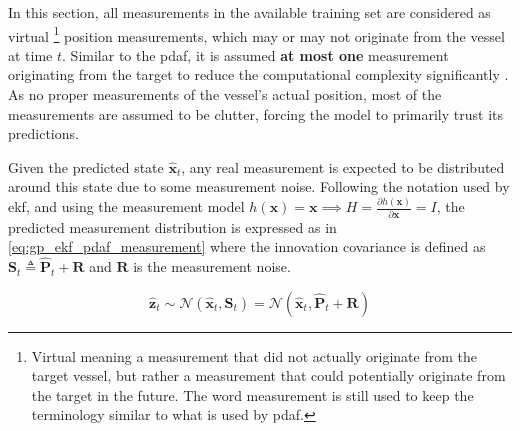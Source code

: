 In this section, all measurements in the available training set are considered as virtual \footnote{Virtual meaning a measurement that did not actually originate from the target vessel, but rather a measurement that could potentially originate from the target in the future. The word measurement is still used to keep the terminology similar to what is used by \acrshort{pdaf}.} position measurements, which may or may not originate from the vessel at time $t$. Similar to the \acrshort{pdaf}, it is assumed \textbf{at most one} measurement originating from the target to reduce the computational complexity significantly \cite{sensorfusjon}. As no proper measurements of the vessel's actual position, most of the measurements are assumed to be clutter, forcing the model to primarily trust its predictions.

Given the predicted state $\hat{\boldsymbol{x}}_t$, any real measurement is expected to be distributed around this state due to some measurement noise. Following the notation used by \acrshort{ekf}, and using the measurement model $h(\boldsymbol{x}) = \boldsymbol{x} \implies H = \frac{\partial h (\boldsymbol{x})}{\partial \boldsymbol{x}} = I$, the predicted measurement distribution is expressed as in \cref{eq:gp_ekf_pdaf_measurement} where the innovation covariance is defined as $\boldsymbol{S}_t \triangleq \hat{\boldsymbol{P}}_t + \boldsymbol{R}$ and $\boldsymbol{R}$ is the measurement noise.

\begin{equation} \label{eq:gp_ekf_pdaf_measurement}
    \hat{\boldsymbol{z}}_t \sim \mathcal{N}(\hat{\boldsymbol{x}}_t, \boldsymbol{S}_{t}) = \mathcal{N}(\hat{\boldsymbol{x}}_t, \hat{\boldsymbol{P}}_t + \boldsymbol{R})
\end{equation}

